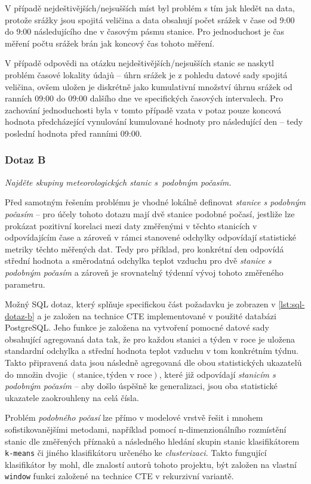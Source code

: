 \documentclass[10pt,a4paper,titlepage]{extarticle}
\begin{document}
    V případě nejdeštivějších/nejsušších míst byl problém s tím jak hledět na data, protože srážky jsou spojitá veličina a data obsahují počet srážek v čase od 9:00 do 9:00 následujícího dne v časovým pásmu stanice. Pro jednoduchost je čas měření počtu srážek brán jak koncový čas tohoto měření.

    V případě odpovědi na otázku nejdeštivějších/nejsušších stanic se naskytl problém časové lokality údajů -- úhrn
    srážek je z pohledu datové sady spojitá veličina, ovšem uložen je diskrétně jako kumulativní množství úhrnu
    srážek od ranních 09:00 do 09:00 dalšího dne ve specifických časových intervalech.
    Pro zachování jednoduchosti byla v tomto případě vzata v potaz pouze koncová hodnota předcházející vynulování
    kumulované hodnoty pro následující den -- tedy poslední hodnota před ranními 09:00.
    
    \subsubsection{Dotaz B}
    \emph{Najděte skupiny meteorologických stanic s~podobným počasím.}

    Před samotným řešením problému je vhodné lokálně definovat \emph{stanice s podobným počasím} -- pro účely tohoto
    dotazu mají dvě stanice podobné počasí, jestliže lze prokázat pozitivní korelaci mezi daty změřenými v těchto
    stanicích v odpovídajícím čase a zároveň v rámci stanovené odchylky odpovídají statistické metriky těchto
    měřených dat. Tedy pro příklad, pro konkrétní den odpovídá střední hodnota a směrodatná odchylka teplot vzduchu
    pro dvě \emph{stanice s podobným počasím} a zároveň je srovnatelný týdenní vývoj tohoto změřeného parametru.

    Možný SQL dotaz, který splňuje specifickou část požadavku je zobrazen v \ref{lst:sql-dotaz-b} a je založen na
    technice CTE implementované v použité databázi PostgreSQL. Jeho funkce je založena na vytvoření pomocné datové
    sady obsahující agregovaná data tak, že pro každou stanici a týden v roce je uložena standardní odchylka a
    střední hodnota teplot vzduchu v tom konkrétním týdnu. Takto připravená data jsou následně agregovaná dle obou
    statistických ukazatelů do množin dvojic $(\text{stanice}, \text{týden v roce})$, které již odpovídají
    \emph{stanicím s podobným počasím} -- aby došlo úspěšně ke generalizaci, jsou oba statistické ukazatele
    zaokrouhleny na celá čísla.

    Problém \emph{podobného počasí} lze přímo v modelové vrstvě řešit i mnohem sofistikovanějšími
    metodami, například pomocí n-dimenzionálního rozmístění stanic dle změřených příznaků a následného hledání 
    skupin stanic klasifikátorem \texttt{k-means} či jiného klasifikátoru určeného ke \emph{clusterizaci}. Takto
    fungující klasifikátor by mohl, dle znalostí autorů tohoto projektu, být založen na vlastní \texttt{window}
    funkci založené na technice CTE v rekurzivní variantě.
\end{document}
